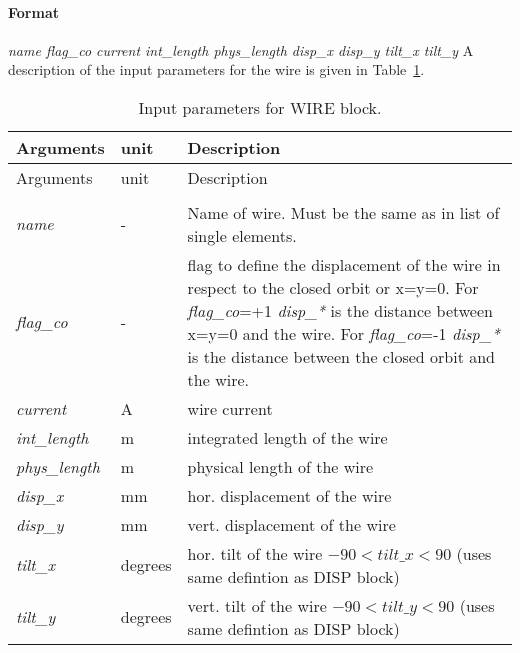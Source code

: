 \documentclass[a4paper,11pt]{report}
\begin{document}
\paragraph{Format} \emph{name flag\_co current int\_length phys\_length disp\_x disp\_y tilt\_x tilt\_y}
A description of the input parameters for the wire is given in Table~\ref{tab:wire}.
\begin{center}
	\begin{longtable}{|p{2.0cm} p{1.0cm} p{9.2cm}|}
		\caption{Input parameters for WIRE block.}
		\label{tab:wire} \\*
		\hline
		\rowcolor{blue!30}
		Arguments & unit & Description \\*
		\hline
		\endfirsthead
		
		\hline
		\rowcolor{blue!30}
		Arguments & unit & Description \\*
		\endhead
		
		\rowcolor{gray!15}
		\multicolumn{3}{|c|}{(The table continues on the next page)}\\*
		\hline
		\endfoot
		
		\hline
		\endlastfoot
		
		\hline
		
		\emph{name} & - &
		Name of wire. Must be the same as in list of single elements.\\*
		
		\emph{flag\_co} & - &
		flag to define the displacement of the wire in respect to the closed orbit or x=y=0. For \emph{flag\_co}=+1 \emph{disp\_*} is the distance between x=y=0 and the wire. For \emph{flag\_co}=-1 \emph{disp\_*} is the distance between the closed orbit and the wire.\\*
		\emph{current} & A &
		wire current \\*
		\emph{int\_length} & m &
		integrated length of the wire\\*
		\emph{phys\_length} & m &
		physical length of the wire\\*
		\emph{disp\_x} & mm &
		hor. displacement of the wire\\*
		\emph{disp\_y} & mm &
		vert. displacement of the wire\\*
		\emph{tilt\_x} & degrees &
		hor. tilt of the wire $-90 < tilt\_x < 90$ (uses same defintion as DISP block) \\*
		\emph{tilt\_y} & degrees &
		vert. tilt of the wire $-90 < tilt\_y < 90$ (uses same defintion as DISP block) \\*
		\hline		
	\end{longtable}
\end{center}
\end{document}
